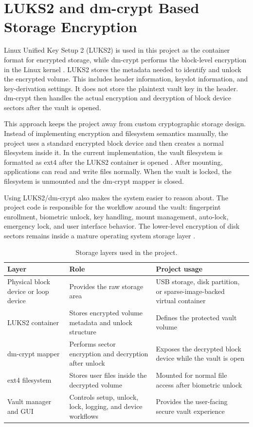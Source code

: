 \section{LUKS2 and dm-crypt Based Storage Encryption}

Linux Unified Key Setup 2 (LUKS2) is used in this project as the container format for encrypted storage, while dm-crypt performs the block-level encryption in the Linux kernel \cite{cryptsetupDocs,linuxDmCryptDocs}. LUKS2 stores the metadata needed to identify and unlock the encrypted volume. This includes header information, keyslot information, and key-derivation settings. It does not store the plaintext vault key in the header. dm-crypt then handles the actual encryption and decryption of block device sectors after the vault is opened.

This approach keeps the project away from custom cryptographic storage design. Instead of implementing encryption and filesystem semantics manually, the project uses a standard encrypted block device and then creates a normal filesystem inside it. In the current implementation, the vault filesystem is formatted as ext4 after the LUKS2 container is opened \cite{linuxExt4Docs}. After mounting, applications can read and write files normally. When the vault is locked, the filesystem is unmounted and the dm-crypt mapper is closed.

Using LUKS2/dm-crypt also makes the system easier to reason about. The project code is responsible for the workflow around the vault: fingerprint enrollment, biometric unlock, key handling, mount management, auto-lock, emergency lock, and user interface behavior. The lower-level encryption of disk sectors remains inside a mature operating system storage layer \cite{linuxDmCryptDocs}.

\begin{table}[!htbp]
\centering
\caption{\label{tab:storage-layers}Storage layers used in the project.}
\begin{tabularx}{\textwidth}{lXX}
\toprule
Layer & Role & Project usage\\
\midrule
Physical block device or loop device & Provides the raw storage area & USB storage, disk partition, or sparse-image-backed virtual container\\
LUKS2 container & Stores encrypted volume metadata and unlock structure & Defines the protected vault volume\\
dm-crypt mapper & Performs sector encryption and decryption after unlock & Exposes the decrypted block device while the vault is open\\
ext4 filesystem & Stores user files inside the decrypted volume & Mounted for normal file access after biometric unlock\\
Vault manager and GUI & Controls setup, unlock, lock, logging, and device workflows & Provides the user-facing secure vault experience\\
\bottomrule
\end{tabularx}
\end{table}

